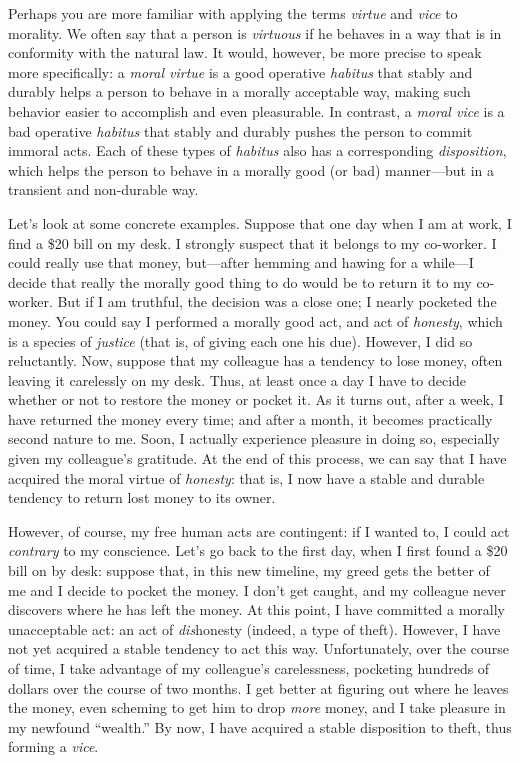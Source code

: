 \documentclass[article,12pt,a4paper,oneside]{memoir}
\begin{document}
    Perhaps you are more familiar with applying the terms \emph{virtue}
    and \emph{vice} to morality. We often say that a person is
    \emph{virtuous} if he behaves in a way that is in conformity with
    the natural law. It would, however, be more precise to speak more
    specifically: a \emph{moral virtue} is a good operative
    \emph{habitus} that stably and durably helps a person to behave in a
    morally acceptable way, making such behavior easier to accomplish
    and even pleasurable. In contrast, a \emph{moral vice} is a bad
    operative \emph{habitus} that stably and durably pushes the person
    to commit immoral acts. Each of these types of \emph{habitus} also
    has a corresponding \emph{disposition}, which helps the person to
    behave in a morally good (or bad) manner---but in a transient and
    non-durable way.

    Let's look at some concrete examples. Suppose that one day when I am
    at work, I find a \$20 bill on my desk. I strongly suspect that it
    belongs to my co-worker. I could really use that money, but---after
    hemming and hawing for a while---I decide that really the morally
    good thing to do would be to return it to my co-worker. But if I am
    truthful, the decision was a close one; I nearly pocketed the money.
    You could say I performed a morally good act, and act of
    \emph{honesty}, which is a species of \emph{justice} (that is, of
    giving each one his due). However, I did so reluctantly. Now,
    suppose that my colleague has a tendency to lose money, often
    leaving it carelessly on my desk. Thus, at least once a day I have
    to decide whether or not to restore the money or pocket it. As it
    turns out, after a week, I have returned the money every time; and
    after a month, it becomes practically second nature to me. Soon, I
    actually experience pleasure in doing so, especially given my
    colleague's gratitude. At the end of this process, we can say that I
    have acquired the moral virtue of \emph{honesty}: that is, I now
    have a stable and durable tendency to return lost money to its
    owner.

    However, of course, my free human acts are contingent: if I wanted
    to, I could act \emph{contrary} to my conscience. Let's go back to
    the first day, when I first found a \$20 bill on by desk: suppose
    that, in this new timeline, my greed gets the better of me and I
    decide to pocket the money. I don't get caught, and my colleague
    never discovers where he has left the money. At this point, I have
    committed a morally unacceptable act: an act of \emph{dis}honesty
    (indeed, a type of theft). However, I have not yet acquired a stable
    tendency to act this way. Unfortunately, over the course of time, I
    take advantage of my colleague's carelessness, pocketing hundreds of
    dollars over the course of two months. I get better at figuring out
    where he leaves the money, even scheming to get him to drop
    \emph{more} money, and I take pleasure in my newfound ``wealth.'' By
    now, I have acquired a stable disposition to theft, thus forming a
    \emph{vice}.
\end{document}
